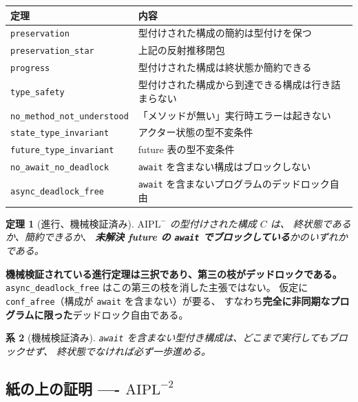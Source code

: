 \documentclass[11pt,a4paper]{ltjsarticle}
\newtheorem{theorem}{定理}
\newtheorem{corollary}[theorem]{系}
\theoremstyle{definition}
\theoremstyle{remark}
\begin{document}
\begin{center}
\begin{tabular}{ll}
\toprule
定理 & 内容 \\
\midrule
\texttt{preservation}            & 型付けされた構成の簡約は型付けを保つ \\
\texttt{preservation\_star}      & 上記の反射推移閉包 \\
\texttt{progress}                & 型付けされた構成は終状態か簡約できる \\
\texttt{type\_safety}            & 型付けされた構成から到達できる構成は行き詰まらない \\
\texttt{no\_method\_not\_understood} & 「メソッドが無い」実行時エラーは起きない \\
\texttt{state\_type\_invariant}  & アクター状態の型不変条件 \\
\texttt{future\_type\_invariant} & future 表の型不変条件 \\
\texttt{no\_await\_no\_deadlock} & \texttt{await} を含まない構成はブロックしない \\
\texttt{async\_deadlock\_free}   & \texttt{await} を含まないプログラムのデッドロック自由 \\
\bottomrule
\end{tabular}
\end{center}

\begin{theorem}[進行、機械検証済み]
$\mathrm{AIPL}^{-}$ の型付けされた構成 $C$ は、
終状態であるか、簡約できるか、
\textbf{未解決 future の \texttt{await} でブロックしている}かのいずれかである。
\end{theorem}

\textbf{機械検証されている進行定理は三択であり、第三の枝がデッドロックである。}
\texttt{async\_deadlock\_free} はこの第三の枝を消した主張ではない。
仮定に \texttt{conf\_afree}（構成が \texttt{await} を含まない）が要る、
すなわち\textbf{完全に非同期なプログラムに限った}デッドロック自由である。

\begin{corollary}[機械検証済み]
\texttt{await} を含まない型付き構成は、どこまで実行してもブロックせず、
終状態でなければ必ず一歩進める。
\end{corollary}

\subsection{紙の上の証明 ---- $\mathrm{AIPL}^{-2}$}
\end{document}
